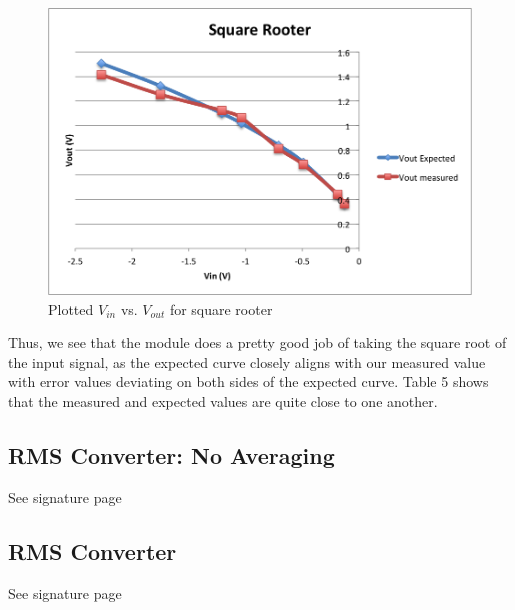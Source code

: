 \documentclass{article}
\begin{document}
    \begin{figure}[H]
        \centering
        \includegraphics[scale = 0.6]{11a.png}
        \caption{Plotted $V_{in}$ vs. $V_{out}$ for square rooter}
        \label{fig:my_label}
    \end{figure}
    Thus, we see that the module does a pretty good job of taking the square root of the input signal, as the expected curve closely aligns with our measured value with error values deviating on both sides of the expected curve. Table 5 shows that the measured and expected values are quite close to one another.
    \subsection{RMS Converter: No Averaging}
        See signature page
    \subsection{RMS Converter}
        See signature page
\end{document}
